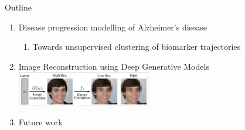 \documentclass[8pt,xcolor=table]{beamer}
\begin{document}
\begin{frame}{Outline}

\begin{enumerate}
 \item Disease progression modelling of Alzheimer's disease 
 \begin{enumerate} 
  \item Towards unsupervised clustering of biomarker trajectories\\
 \end{enumerate}
   
 
  
  \vt

 \item Image Reconstruction using Deep Generative Models\\
 \includegraphics[height=1.5cm, trim=6 6 300 6,clip]{brgm_diagram_small}
\vt
 
  \item Future work\\

\end{enumerate}
 


\end{frame}
\end{document}
